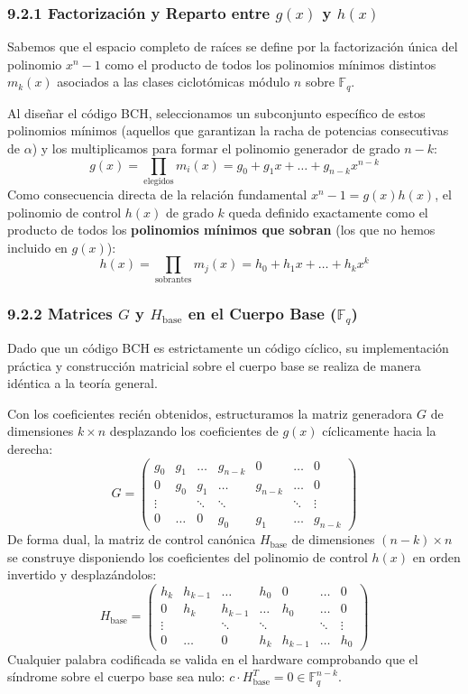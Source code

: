 \documentclass{article}
\begin{document}
\subsubsection{9.2.1 Factorización y Reparto entre $g(x)$ y $h(x)$}
Sabemos que el espacio completo de raíces se define por la factorización única del polinomio $x^n - 1$ como el producto de todos los polinomios mínimos distintos $m_k(x)$ asociados a las clases ciclotómicas módulo $n$ sobre $\mathbb{F}_q$.

Al diseñar el código BCH, seleccionamos un subconjunto específico de estos polinomios mínimos (aquellos que garantizan la racha de potencias consecutivas de $\alpha$) y los multiplicamos para formar el polinomio generador de grado $n-k$:
\[
g(x) = \prod_{\text{elegidos}} m_i(x) = g_0 + g_1 x + \dots + g_{n-k} x^{n-k}
\]
Como consecuencia directa de la relación fundamental $x^n - 1 = g(x)h(x)$, el polinomio de control $h(x)$ de grado $k$ queda definido exactamente como el producto de todos los \textbf{polinomios mínimos que sobran} (los que no hemos incluido en $g(x)$):
\[
h(x) = \prod_{\text{sobrantes}} m_j(x) = h_0 + h_1 x + \dots + h_k x^k
\]

\subsubsection{9.2.2 Matrices $G$ y $H_{\text{base}}$ en el Cuerpo Base ($\mathbb{F}_q$)}
Dado que un código BCH es estrictamente un código cíclico, su implementación práctica y construcción matricial sobre el cuerpo base se realiza de manera idéntica a la teoría general. 

Con los coeficientes recién obtenidos, estructuramos la matriz generadora $G$ de dimensiones $k \times n$ desplazando los coeficientes de $g(x)$ cíclicamente hacia la derecha:
\[
G = \begin{pmatrix}
g_0 & g_1 & \dots & g_{n-k} & 0 & \dots & 0 \\
0 & g_0 & g_1 & \dots & g_{n-k} & \dots & 0 \\
\vdots & & \ddots & \ddots & & \ddots & \vdots \\
0 & \dots & 0 & g_0 & g_1 & \dots & g_{n-k}
\end{pmatrix}
\]
De forma dual, la matriz de control canónica $H_{\text{base}}$ de dimensiones $(n-k) \times n$ se construye disponiendo los coeficientes del polinomio de control $h(x)$ en orden invertido y desplazándolos:
\[
H_{\text{base}} = \begin{pmatrix}
h_k & h_{k-1} & \dots & h_0 & 0 & \dots & 0 \\
0 & h_k & h_{k-1} & \dots & h_0 & \dots & 0 \\
\vdots & & \ddots & \ddots & & \ddots & \vdots \\
0 & \dots & 0 & h_k & h_{k-1} & \dots & h_0
\end{pmatrix}
\]
Cualquier palabra codificada se valida en el hardware comprobando que el síndrome sobre el cuerpo base sea nulo: $c \cdot H_{\text{base}}^T = 0 \in \mathbb{F}_q^{n-k}$.
\end{document}
